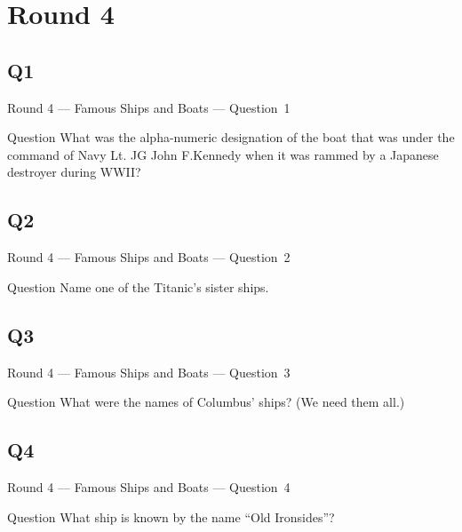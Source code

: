 \documentclass[11pt]{beamer}
\begin{document}
\section{Round 4}
\subsection*{Q1}
\begin{frame}[t]{Round 4 --- Famous Ships and Boats --- \mbox{Question 1}}
    \vspace{-0.5em}
    \begin{block}{Question}
        What was the alpha-numeric designation of the boat that was under the command of Navy Lt. JG John F.\@  Kennedy when it was rammed by a Japanese destroyer during WWII\@?
    \end{block}
\end{frame}
\subsection*{Q2}
\begin{frame}[t]{Round 4 --- Famous Ships and Boats --- \mbox{Question 2}}
    \vspace{-0.5em}
    \begin{block}{Question}
        Name one of the Titanic's sister ships.
    \end{block}
\end{frame}
\subsection*{Q3}
\begin{frame}[t]{Round 4 --- Famous Ships and Boats --- \mbox{Question 3}}
    \vspace{-0.5em}
    \begin{block}{Question}
        What were the names of Columbus' ships? (We need them all.)
    \end{block}
\end{frame}
\subsection*{Q4}
\begin{frame}[t]{Round 4 --- Famous Ships and Boats --- \mbox{Question 4}}
    \vspace{-0.5em}
    \begin{block}{Question}
        What ship is known by the name ``Old Ironsides''?
    \end{block}
\end{frame}
\end{document}
